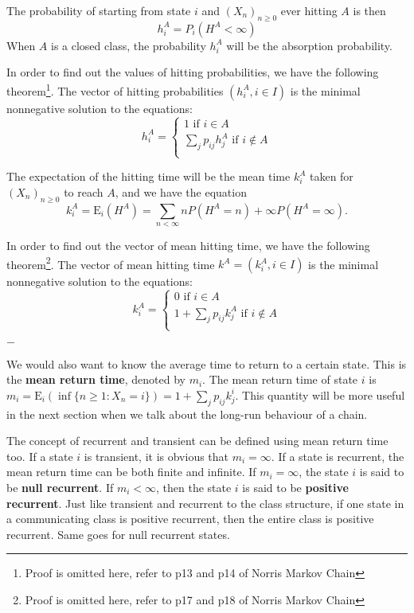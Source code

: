 \documentclass[11pt, a4paper, oneside]{book}
\theoremstyle{definition}
\newcommand{\breaking}{%
    \begin{center}
    $-$
    \end{center}%
}
\begin{document}
\noindent The probability of starting from state $i$ and $(X_n)_{n \ge 0}$ ever hitting $A$ is then\[
h_i^A = P_i(H^A < \infty)
\]
When $A$ is a closed class, the probability $h_i^A$ will be the absorption probability. 

\noindent In order to find out the values of hitting probabilities, we have the following theorem\footnote{Proof is omitted here, refer to p13 and p14 of Norris Markov Chain}. The vector of hitting probabilities $(h_i^A, i \in I)$ is the minimal nonnegative solution to the equations: 
\begin{equation*}
h_i^A = 
\begin{cases} 
      1 \text{ if }i \in A\\
      \sum_j p_{ij}h_j^A \text{ if }i \notin A\\
\end{cases}
\end{equation*}

\noindent The expectation of the hitting time will be the mean time $k_i^A$ taken for $(X_n)_{n \ge 0}$ to reach $A$, and we have the equation \[
k_i^A = \text{E}_i(H^A) = \sum_{n < \infty} nP(H^A = n) + \infty P(H^A = \infty).
\]

\noindent In order to find out the vector of mean hitting time, we have the following theorem\footnote{Proof is omitted here, refer to p17 and p18 of Norris Markov Chain}. The vector of mean hitting time $k^A = (k_i^A, i \in I)$ is the minimal nonnegative solution to the equations: 
\begin{equation*}
k_i^A = 
\begin{cases} 
      0 \text{ if }i \in A\\
      1 + \sum_j p_{ij}k_j^A \text{ if }i \notin A\\
\end{cases}
\end{equation*}

\breaking

\noindent We would also want to know the average time to return to a certain state. This is the \textbf{mean return time}, denoted by $m_i$. The mean return time of state $i$ is $m_i = \text{E}_i(\inf\{ n \ge 1: X_n = i \}) = 1 + \sum_j p_{ij}k_j^{i}$. This quantity will be more useful in the next section when we talk about the long-run behaviour of a chain. 

\noindent The concept of recurrent and transient can be defined using mean return time too. If a state $i$ is transient, it is obvious that $m_i = \infty$. If a state is recurrent, the mean return time can be both finite and infinite. If $m_i =\infty$, the state $i$ is said to be \textbf{null recurrent}. If $m_i < \infty$, then the state $i$ is said to be \textbf{positive recurrent}. Just like transient and recurrent to the class structure, if one state in a communicating class is positive recurrent, then the entire class is positive recurrent. Same goes for null recurrent states. 
\end{document}
